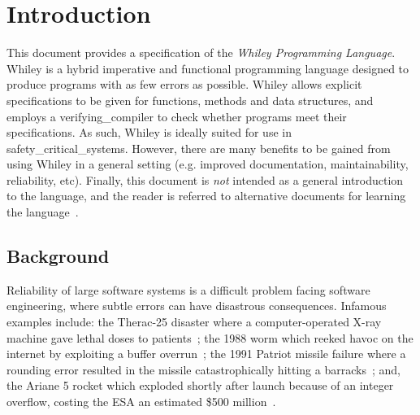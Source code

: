 \chapter{Introduction}

This document provides a specification of the {\em Whiley Programming Language}.  Whiley is a hybrid imperative and functional programming language designed to produce programs with as few errors as possible.  Whiley allows explicit specifications to be given for functions, methods and data structures, and employs a \gls{verifying_compiler} to check whether programs meet their specifications.  As such, Whiley is ideally suited for use in \gls{safety_critical_system}s.  However, there are many benefits to be gained from using Whiley in a general setting (e.g. improved documentation, maintainability, reliability, etc).  Finally, this document is {\em not} intended as a general introduction to the language, and the reader is referred to alternative documents for learning the language~\cite{Pearce14a}.


\section{Background}

Reliability of large software systems is a difficult problem facing
software engineering, where subtle errors can have disastrous
consequences.  Infamous examples include: the Therac-25 disaster where
a computer-operated X-ray machine gave lethal doses to
patients~\cite{LT93}; the 1988 worm which reeked havoc on the internet
by exploiting a buffer overrun~\cite{ER89}; the 1991 Patriot missile
failure where a rounding error resulted in the missile catastrophically
hitting a barracks~\cite{GAO}; and, the Ariane 5 rocket which exploded
shortly after launch because of an integer overflow, costing the ESA
an estimated \$500 million~\cite{ARIAN5}.


